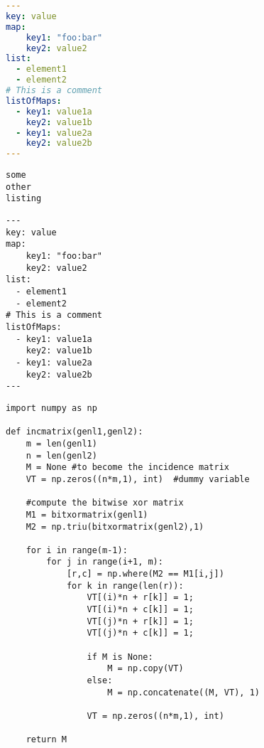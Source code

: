 \begin{lstlisting}[language=yaml]
---
key: value
map:
    key1: "foo:bar"
    key2: value2
list:
  - element1
  - element2
# This is a comment
listOfMaps:
  - key1: value1a
    key2: value1b
  - key1: value2a
    key2: value2b
---
\end{lstlisting}

\begin{lstlisting}[frame=single]
some
other
listing
\end{lstlisting}

\begin{verbatim}
---
key: value
map:
    key1: "foo:bar"
    key2: value2
list:
  - element1
  - element2
# This is a comment
listOfMaps:
  - key1: value1a
    key2: value1b
  - key1: value2a
    key2: value2b
---
\end{verbatim}



\begin{verbatim}
import numpy as np
    
def incmatrix(genl1,genl2):
    m = len(genl1)
    n = len(genl2)
    M = None #to become the incidence matrix
    VT = np.zeros((n*m,1), int)  #dummy variable
    
    #compute the bitwise xor matrix
    M1 = bitxormatrix(genl1)
    M2 = np.triu(bitxormatrix(genl2),1) 

    for i in range(m-1):
        for j in range(i+1, m):
            [r,c] = np.where(M2 == M1[i,j])
            for k in range(len(r)):
                VT[(i)*n + r[k]] = 1;
                VT[(i)*n + c[k]] = 1;
                VT[(j)*n + r[k]] = 1;
                VT[(j)*n + c[k]] = 1;
                
                if M is None:
                    M = np.copy(VT)
                else:
                    M = np.concatenate((M, VT), 1)
                
                VT = np.zeros((n*m,1), int)
    
    return M
\end{verbatim}
